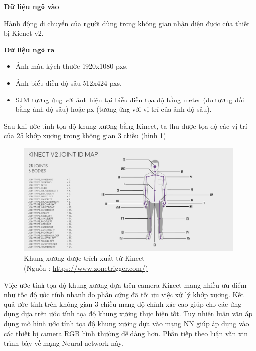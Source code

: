 \underline{\textbf{Dữ liệu ngõ vào}}

Hành động di chuyển của người dùng trong không gian nhận diện được của thiết bị Kienct v2.

\underline{\textbf{Dữ liệu ngõ ra}}
\begin{itemize}
\item Ảnh màu kých thước 1920x1080 pxs.

\item Ảnh biểu diễn độ sâu 512x424 pxs.

\item SJM tương ứng với ảnh hiện tại biễu diễn tọa độ bằng meter (đo tương đối bằng ảnh độ sâu) hoặc px (tương ứng với vị trí của ảnh độ sâu).
\end{itemize}

Sau khi ước tính tọa độ khung xương bằng Kinect, ta thu được tọa độ các vị trí của 25 khớp xương trong không gian 3 chiều (hình \ref{fig:skeleton_kinect})

\FloatBarrier
\begin{figure}[htp]
\begin{center}
\includegraphics[scale=0.4]{chap3/c3_figs/kinectskeleton.png}
\end{center}
\caption{Khung xương được trích xuất từ Kinect \\(Nguồn : \url{https://www.zonetrigger.com/)}}
\label{fig:skeleton_kinect}
\end{figure}
\FloatBarrier

Việc ước tính tọa độ khung xương dựa trên camera Kinect mang nhiều ưu điểm như tốc độ ước tính nhanh do phần cứng đã tối ưu việc xử lý khớp xương. Kết quả ước tính trên không gian 3 chiều mang độ chính xác cao giúp cho các ứng dụng dựa trên ước tính tọa độ khung xương thực hiện tốt. Tuy nhiên luận văn áp dụng mô hình ước tính tọa độ khung xương dựa vào mạng NN giúp áp dụng vào các thiết bị camera RGB bình thường dễ dàng hơn. Phần tiếp theo luận văn xin trình bày về mạng Neural network này.

